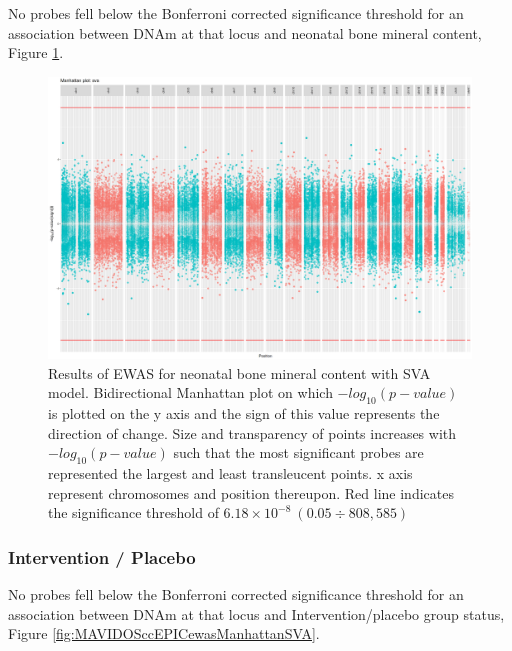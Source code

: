 \documentclass[]{book}
\begin{document}
No probes fell below the Bonferroni corrected significance threshold for an association between DNAm at that locus and neonatal bone mineral content, Figure \ref{fig:MAVIDOSbmcEPICewasManhattanSVA}.

\begin{figure}

{\centering \includegraphics[width=0.8\linewidth]{figs/MAVIDOSbmcEPICewasManhattanSVA} 

}

\caption{Results of EWAS for neonatal bone mineral content with SVA model. Bidirectional Manhattan plot on which \(-log_{10}(p-value)\) is plotted on the y axis and the sign of this value represents the direction of change. Size and transparency of points increases with \(-log_{10}(p-value)\) such that the most significant probes are represented the largest and least transleucent points. x axis represent chromosomes and position thereupon. Red line indicates the significance threshold of \(6.18\times10^{-8}~(0.05\div808,585)\)}\label{fig:MAVIDOSbmcEPICewasManhattanSVA}
\end{figure}



\hypertarget{intervention-placebo}{%
\subsubsection{Intervention / Placebo}\label{intervention-placebo}}

No probes fell below the Bonferroni corrected significance threshold for an association between DNAm at that locus and Intervention/placebo group status, Figure \ref{fig:MAVIDOSccEPICewasManhattanSVA}.
\end{document}
